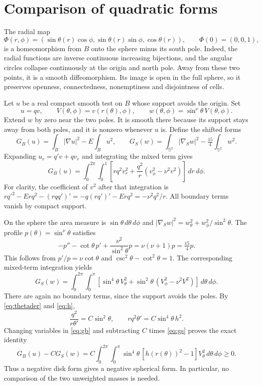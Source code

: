 \documentclass[11pt]{article}
\newcommand{\Sph}{\mathbb S^2}
\newcommand{\dd}{\,d}
\begin{document}
\section{Comparison of quadratic forms}
The radial map
\begin{equation}\label{eq:map}
 \Phi(r,\phi)=(\sin\theta(r)\cos\phi,
               \sin\theta(r)\sin\phi,\cos\theta(r)),
 \qquad\Phi(0)=(0,0,1),
\end{equation}
is a homeomorphism from $B$ onto the sphere minus its south pole.
Indeed, the radial functions are inverse continuous increasing bijections,
and the angular circles collapse continuously at the origin and north pole.
Away from these two points, it is a smooth diffeomorphism.
Its image is open in the full sphere, so it preserves openness,
connectedness, nonemptiness and disjointness of cells.

Let $u$ be a real compact smooth test on $B$ whose support avoids the origin.
Set
\[
 u=qv,\qquad V(\theta,\phi)=v(r(\theta),\phi),\qquad
 w(\theta,\phi)=\sin^\nu\theta\,V(\theta,\phi).
\]
Extend $w$ by zero near the two poles. It is smooth there because its
support stays away from both poles, and it is nonzero whenever $u$ is.
Define the shifted forms
\[
 G_B(u)=\int_B|\nabla u|^2-E\int_Bu^2,\qquad
 G_S(w)=\int_{\Sph}|\nabla_Sw|^2-\tfrac{15}{4}\int_{\Sph}w^2.
\]
Expanding $u_r=q'v+qv_r$ and integrating the mixed term gives
\begin{equation}\label{eq:gb}
 G_B(u)=\int_0^{2\pi}\int_0^1
 \left[rq^2v_r^2+\frac{q^2}{r}(v_\phi^2-\nu^2v^2)\right]\dd r\dd\phi.
\end{equation}
For clarity, the coefficient of $v^2$ after that integration is
$r q'^2-Erq^2-(rqq')'=-q(rq')'-Erq^2=-\nu^2q^2/r$.
All boundary terms vanish by compact support.

On the sphere the area measure is $\sin\theta\dd\theta\dd\phi$ and
$|\nabla_Sw|^2=w_\theta^2+w_\phi^2/\sin^2\theta$.
The profile $p(\theta)=\sin^\nu\theta$ satisfies
\[
 -p''-\cot\theta\,p'+\frac{\nu^2}{\sin^2\theta}p
       =\nu(\nu+1)p=\tfrac{15}{4}p.
\]
This follows from $p'/p=\nu\cot\theta$ and
$\csc^2\theta-\cot^2\theta=1$.
The corresponding mixed-term integration yields
\begin{equation}\label{eq:gs}
 G_S(w)=\int_0^{2\pi}\int_0^\pi
 \left[\sin^4\theta\,V_\theta^2+
       \sin^2\theta\,(V_\phi^2-\nu^2V^2)\right]\dd\theta\dd\phi.
\end{equation}
There are again no boundary terms, since the support avoids the poles.
By \eqref{eq:thetader} and \eqref{eq:h},
\[
 \frac{q^2}{r\theta'}=C\sin^2\theta,
 \qquad rq^2\theta'=C\sin^4\theta\,h^2.
\]
Changing variables in \eqref{eq:gb} and subtracting $C$ times
\eqref{eq:gs} proves the exact identity
\begin{equation}\label{eq:comparison}
 G_B(u)-CG_S(w)=C\int_0^{2\pi}\int_0^\pi
  \sin^4\theta\,[h(r(\theta))^2-1]V_\theta^2\dd\theta\dd\phi\ge0.
\end{equation}
Thus a negative disk form gives a negative spherical form. In particular,
no comparison of the two unweighted masses is needed.
\end{document}
